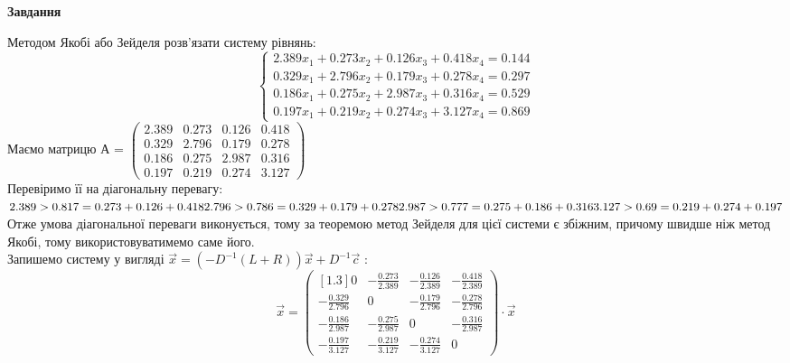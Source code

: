 \documentclass[14 pt]{extarticle}
\begin{document}
\begin{center}
    \large
    \textbf{Завдання}
\end{center}
\small{
    Методом Якобі або Зейделя розв'язати систему рівнянь:\\ 
    $$
    \begin{cases}
        2.389 x_1 + 0.273 x_2 + 0.126 x_3 + 0.418 x_4 = 0.144 \\ 
        0.329 x_1 + 2.796 x_2 + 0.179 x_3 + 0.278 x_4 = 0.297 \\ 
        0.186 x_1 + 0.275 x_2 + 2.987 x_3 + 0.316 x_4 = 0.529 \\ 
        0.197 x_1 + 0.219 x_2 + 0.274 x_3 + 3.127 x_4 = 0.869 
    \end{cases}
    $$
    Маємо матрицю А = $
    \begin{pmatrix}
        2.389 & 0.273 & 0.126 & 0.418 \\ 
        0.329 & 2.796 & 0.179 & 0.278  \\ 
        0.186 & 0.275 & 2.987 & 0.316  \\ 
        0.197 & 0.219 & 0.274 & 3.127 
    \end{pmatrix}$\\ 
    Перевіримо її на діагональну перевагу: \\ 
    $
    2.389 > 0.817 = 0.273 + 0.126 + 0.418  \\ 
    2.796 > 0.786 = 0.329 + 0.179 + 0.278  \\ 
    2.987 > 0.777 = 0.275 +  0.186+ 0.316  \\ 
    3.127 > 0.69 = 0.219 + 0.274 +  0.197
    $\\ 
    Отже умова діагональної переваги виконується, тому за теоремою метод Зейделя для цієї системи є збіжним,
    причому швидше ніж метод Якобі, тому використовуватимемо саме його. \\ 
    Запишемо систему у вигляді $\vec{x} = (-D^{-1} (L + R) )\vec{x} + D^{-1}\vec{c}$ :
    $$
    \vec{x} = \begin{pmatrix}[1.3]
        0 & -\frac{0.273}{2.389} & -\frac{0.126}{2.389} & -\frac{0.418}{2.389} \\ 
        -\frac{0.329}{2.796} & 0 & -\frac{0.179}{2.796} & -\frac{0.278}{2.796}  \\ 
        -\frac{0.186}{2.987} & -\frac{0.275}{2.987} & 0 & -\frac{0.316}{2.987}  \\ 
        -\frac{0.197}{3.127 } & -\frac{0.219}{3.127 } & -\frac{0.274}{3.127 } & 0 
    \end{pmatrix}
    \cdot \vec{x} 
$$}
\end{document}

